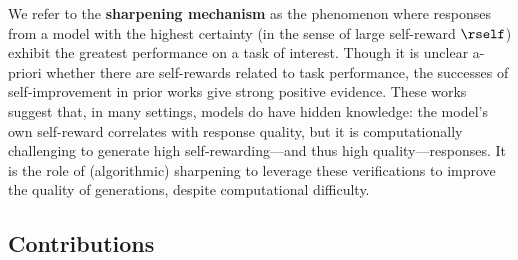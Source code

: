 We refer to the \textbf{sharpening mechanism} as the phenomenon where responses from a model with the highest certainty (in the sense
of large self-reward $\rself$) exhibit the greatest performance on a
task of interest. Though it is unclear a-priori whether there are self-rewards related to task performance, the successes of self-improvement in prior works \citep{huang2022large,wang2022self,bai2022constitutional,pang2023language,yuan2024self} give strong positive evidence.
These works suggest that, in many settings, models do have hidden knowledge: the model's own self-reward correlates with response quality, but it is computationally challenging to generate high self-rewarding---and thus high quality---responses. It is the role of (algorithmic) sharpening to leverage these verifications to improve the quality of generations, despite computational difficulty.\loose






        
        












        
        
\newcommand{\rbase}{r_{\mathrm{base}}}












    





    
    

    





    
            
    

    


    





\subsection{Contributions}






